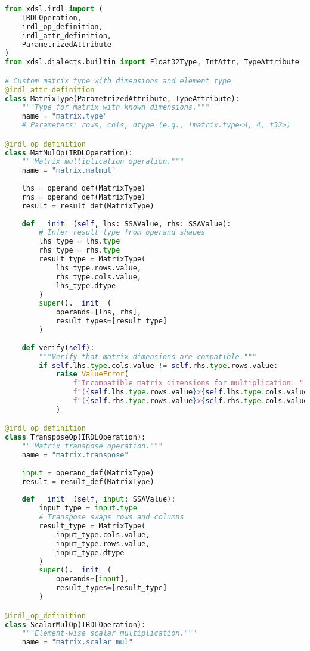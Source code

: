 \documentclass[11pt,a4paper]{article}
\begin{document}
\begin{lstlisting}[language=Python, caption=Dialect Structure Overview]
from xdsl.irdl import (
    IRDLOperation,
    irdl_op_definition,
    irdl_attr_definition,
    ParametrizedAttribute
)
from xdsl.dialects.builtin import Float32Type, IntAttr, TypeAttribute

# Custom matrix type with dimensions and element type
@irdl_attr_definition
class MatrixType(ParametrizedAttribute, TypeAttribute):
    """Type for matrix with known dimensions."""
    name = "matrix.type"
    # Parameters: rows, cols, dtype (e.g., !matrix.type<4, 4, f32>)

@irdl_op_definition
class MatMulOp(IRDLOperation):
    """Matrix multiplication operation."""
    name = "matrix.matmul"
    
    lhs = operand_def(MatrixType)
    rhs = operand_def(MatrixType)
    result = result_def(MatrixType)
    
    def __init__(self, lhs: SSAValue, rhs: SSAValue):
        # Infer result type from operand shapes
        lhs_type = lhs.type
        rhs_type = rhs.type
        result_type = MatrixType(
            lhs_type.rows.value,
            rhs_type.cols.value,
            lhs_type.dtype
        )
        super().__init__(
            operands=[lhs, rhs],
            result_types=[result_type]
        )
    
    def verify(self):
        """Verify that matrix dimensions are compatible."""
        if self.lhs.type.cols.value != self.rhs.type.rows.value:
            raise ValueError(
                f"Incompatible matrix dimensions for multiplication: "
                f"({self.lhs.type.rows.value}x{self.lhs.type.cols.value}) @ "
                f"({self.rhs.type.rows.value}x{self.rhs.type.cols.value})"
            )

@irdl_op_definition
class TransposeOp(IRDLOperation):
    """Matrix transpose operation."""
    name = "matrix.transpose"
    
    input = operand_def(MatrixType)
    result = result_def(MatrixType)
    
    def __init__(self, input: SSAValue):
        input_type = input.type
        # Transpose swaps rows and columns
        result_type = MatrixType(
            input_type.cols.value,
            input_type.rows.value,
            input_type.dtype
        )
        super().__init__(
            operands=[input],
            result_types=[result_type]
        )

@irdl_op_definition
class ScalarMulOp(IRDLOperation):
    """Element-wise scalar multiplication."""
    name = "matrix.scalar_mul"
    

\end{lstlisting}
\end{document}
